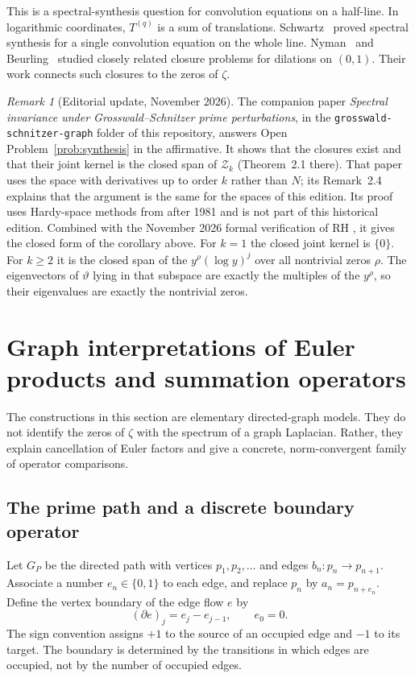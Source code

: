 \documentclass[12pt,letterpaper]{article}
\theoremstyle{definition}
\theoremstyle{remark}
\newtheorem{remark}[theorem]{Remark}
\numberwithin{equation}{section}
\newcommand{\yD}{\vartheta}
\begin{document}
This is a spectral-synthesis question for convolution equations on a
half-line. In logarithmic coordinates, $T^{(q)}$ is a sum of translations.
Schwartz~\cite{Sc47} proved spectral synthesis for a single convolution
equation on the whole line. Nyman~\cite{Ny50} and Beurling~\cite{Be55}
studied closely related closure problems for dilations on $(0,1)$. Their
work connects such closures to the zeros of $\zeta$.

\begin{remark}[Editorial update, November 2026]\label{rem:synthesis-2026}
The companion paper \emph{Spectral invariance under Grosswald--Schnitzer
prime perturbations}, in the \texttt{grosswald-schnitzer-graph} folder of
this repository, answers Open Problem~\ref{prob:synthesis} in the
affirmative.  It shows that the closures exist and that their joint
kernel is the closed span of $\mathcal Z_k$ (Theorem~2.1 there).
That paper uses the space with derivatives up to order $k$ rather than
$N$; its Remark~2.4 explains that the argument is the same for
the spaces of this edition.  Its proof uses Hardy-space methods from
after 1981 and is not part of this historical edition.  Combined with the
November 2026 formal verification of RH \cite{LF26,Ru26}, it gives the
closed form of the corollary above.  For $k=1$ the closed joint kernel
is $\{0\}$.  For $k\ge2$ it is the closed span of the $y^\rho(\log y)^j$
over all nontrivial zeros $\rho$.  The eigenvectors of $\yD$ lying in
that subspace are exactly the multiples of the $y^\rho$, so their
eigenvalues are exactly the nontrivial zeros.
\end{remark}

\section{Graph interpretations of Euler products and summation operators}
\label{sec:graphs}

The constructions in this section are elementary directed-graph models.
They do not identify the zeros of $\zeta$ with the spectrum of a graph
Laplacian.  Rather, they explain cancellation of Euler factors and give
a concrete, norm-convergent family of operator comparisons.

\subsection{The prime path and a discrete boundary operator}

Let $G_P$ be the directed path with vertices $p_1,p_2,\ldots$ and
edges $b_n:p_n\to p_{n+1}$.  Associate a number
$e_n\in\{0,1\}$ to each edge, and replace $p_n$ by
$a_n=p_{n+e_n}$.  Define the vertex boundary of the edge flow $e$ by
\begin{equation}\label{eq:graph-boundary}
 (\partial e)_j=e_j-e_{j-1},\qquad e_0=0.
\end{equation}
The sign convention assigns $+1$ to the source of an occupied edge and
$-1$ to its target.  The boundary is determined by the transitions in
which edges are occupied, not by the number of occupied edges.
\end{document}
